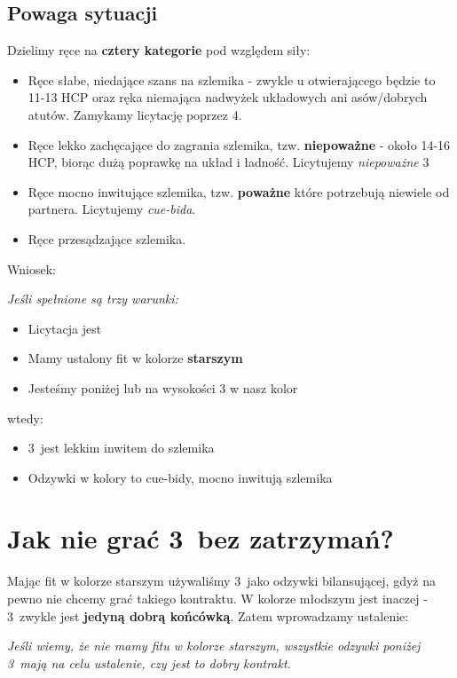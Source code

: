 \documentclass[12pt, a4paper]{article}
\begin{document}
    \subsection{Powaga sytuacji}
    Dzielimy ręce na \textbf{cztery kategorie} pod względem siły:
    \begin{itemize}
        \item Ręce słabe, niedające szans na szlemika - zwykle u otwierającego będzie to 11-13 HCP
        oraz ręka niemająca nadwyżek układowych ani asów/dobrych atutów. Zamykamy licytację poprzez 4\major.
        \item Ręce lekko zachęcające do zagrania szlemika, 
        tzw. \textbf{niepoważne} - około 14-16 HCP, 
        biorąc dużą poprawkę na układ i ładność. Licytujemy \emph{niepoważne} 3\nt
        \item Ręce mocno inwitujące szlemika, tzw. \textbf{poważne} które potrzebują niewiele od partnera.
        Licytujemy \emph{cue-bida}.
        \item Ręce przesądzające szlemika.
    \end{itemize}

    Wniosek:
    \begin{formal}
        \itshape
        Jeśli spełnione są trzy warunki:
        \begin{itemize}
            \item Licytacja jest \gf
            \item Mamy ustalony fit w kolorze \textbf{starszym}
            \item Jesteśmy poniżej lub na wysokości 3 w nasz kolor
        \end{itemize}
        wtedy:
        \begin{itemize}
            \item 3\nt\ jest lekkim inwitem do szlemika
            \item Odzywki w kolory to cue-bidy, mocno inwitują szlemika
        \end{itemize}
    \end{formal}

    \pagebreak
    \section{Jak nie grać 3\ntx\ bez zatrzymań?}

    Mając fit w kolorze starszym używaliśmy 3\nt\ jako odzywki bilansującej,
    gdyż na pewno nie chcemy grać takiego kontraktu. W kolorze młodszym jest inaczej - 
    3\nt\ zwykle jest \textbf{jedyną dobrą końcówką}. Zatem wprowadzamy ustalenie:
    \begin{formal}
        \itshape
        Jeśli wiemy, że nie mamy fitu w kolorze starszym, wszystkie odzywki 
        poniżej 3\nt\ mają na celu ustalenie, czy jest to dobry kontrakt.
    \end{formal}
\end{document}
